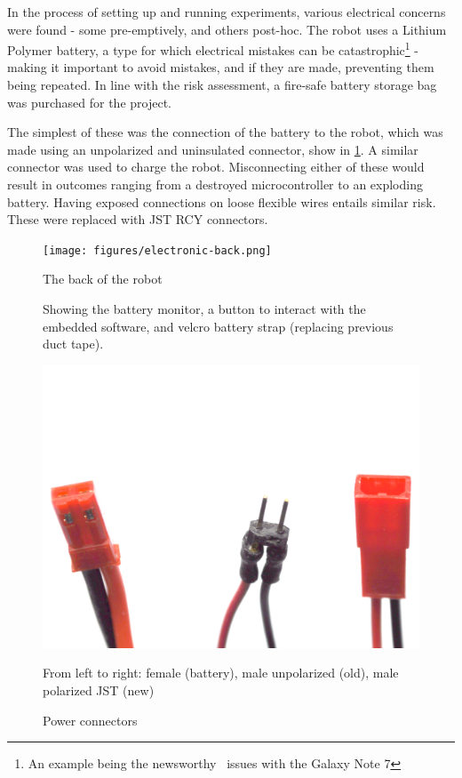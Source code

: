 \documentclass[main.tex]{subfiles}
\begin{document}
In the process of setting up and running experiments, various electrical concerns were found - some pre-emptively, and others post-hoc. The robot uses a Lithium Polymer battery, a type for which electrical mistakes can be catastrophic\footnote{An example being the newsworthy~\cite{bbc-samsung-explosion} issues with the Galaxy Note 7} - making it important to avoid mistakes, and if they are made, preventing them being repeated. In line with the risk assessment, a fire-safe battery storage bag was purchased for the project.

The simplest of these was the connection of the battery to the robot, which was made using an unpolarized and uninsulated connector, show in \cref{fig:connectors}. A similar connector was used to charge the robot. Misconnecting either of these would result in outcomes ranging from a destroyed microcontroller to an exploding battery. Having exposed connections on loose flexible wires entails similar risk. These were replaced with JST RCY connectors.

\begin{figure}
	\begin{minipage}[t]{0.6\linewidth - 1em}
		\centering
		\texttt{[image: figures/electronic-back.png]}
		\caption{The back of the robot}
		\label{fig:robot-back}
		\medskip
		\small
		Showing the battery monitor, a button to interact with the embedded software, and velcro battery strap
		(replacing previous duct tape).
	\end{minipage}\hfill
	\begin{minipage}[t]{0.4\linewidth - 1em}
		\centering
		\includegraphics[width=\linewidth]{figures/battery-connectors.png}
		\caption{Power connectors}
		\label{fig:connectors}
		\medskip
		\small
		From left to right: female (battery), male unpolarized (old), male polarized JST (new)
	\end{minipage}
\end{figure}
\end{document}
